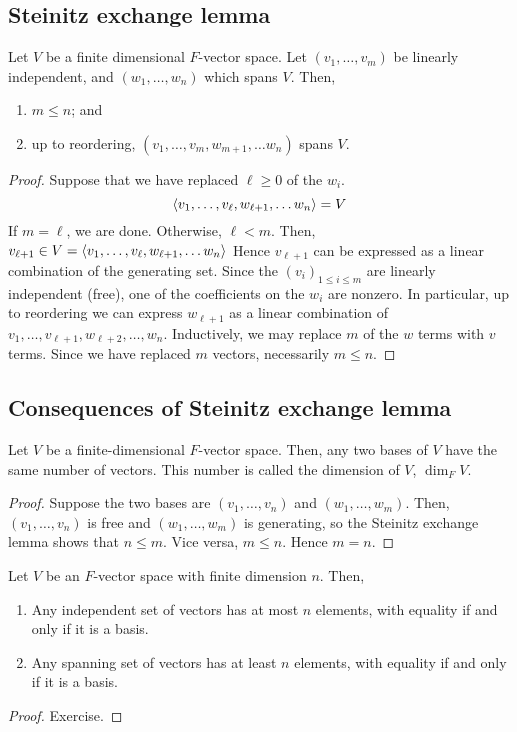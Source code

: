 \subsection{Steinitz exchange lemma}
\begin{theorem}
	Let \( V \) be a finite dimensional \( F \)-vector space.
	Let \( (v_1, \dots, v_m) \) be linearly independent, and \( (w_1, \dots, w_n) \) which spans \( V \).
	Then,
	\begin{enumerate}
		\item \( m \leq n \); and
		\item up to reordering, \( (v_1, \dots, v_m, w_{m+1}, \dots w_n) \) spans \( V \).
	\end{enumerate}
\end{theorem}
\begin{proof}
	Suppose that we have replaced \( \ell \geq 0 \) of the \( w_i \).
	\[
		\left\langle{} v_1, \dots, v_\ell, w_{\ell+1}, \dots w_n \right\rangle = V
	\]
	If \( m = \ell \), we are done.
	Otherwise, \( \ell < m \).
	Then,
	\( v_{\ell + 1} \in V = \left\langle{} v_1, \dots, v_\ell, w_{\ell+1}, \dots w_n \right\rangle \)
	Hence \( v_{\ell + 1} \) can be expressed as a linear combination of the generating set.
	Since the \( (v_i)_{1 \leq i \leq m} \) are linearly independent (free), one of the coefficients on the \( w_i \) are nonzero.
	In particular, up to reordering we can express \( w_{\ell+1} \) as a linear combination of \( v_1, \dots, v_{\ell + 1}, w_{\ell + 2}, \dots, w_n \).
	Inductively, we may replace \( m \) of the \( w \) terms with \( v \) terms.
	Since we have replaced \( m \) vectors, necessarily \( m \leq n \).
\end{proof}

\subsection{Consequences of Steinitz exchange lemma}
\begin{corollary}
	Let \( V \) be a finite-dimensional \( F \)-vector space.
	Then, any two bases of \( V \) have the same number of vectors.
	This number is called the dimension of \( V \), \( \dim_F V \).
\end{corollary}
\begin{proof}
	Suppose the two bases are \( (v_1, \dots, v_n) \) and \( (w_1, \dots, w_m) \).
	Then, \( (v_1, \dots, v_n) \) is free and \( (w_1, \dots, w_m) \) is generating, so the Steinitz exchange lemma shows that \( n \leq m \).
	Vice versa, \( m \leq n \).
	Hence \( m = n \).
\end{proof}
\begin{corollary}
	Let \( V \) be an \( F \)-vector space with finite dimension \( n \).
	Then,
	\begin{enumerate}
		\item Any independent set of vectors has at most \( n \) elements, with equality if and only if it is a basis.
		\item Any spanning set of vectors has at least \( n \) elements, with equality if and only if it is a basis.
	\end{enumerate}
\end{corollary}
\begin{proof}
	Exercise.
\end{proof}

